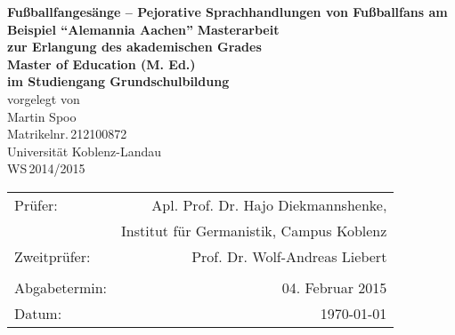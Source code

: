 \begin{titlepage}
	\begin{center}
		\quad
		\vfill
		\Huge{
			 \textbf{Fußballfangesänge – Pejorative Sprachhandlungen von Fußballfans am Beispiel "`Alemannia Aachen"'}
		}
		\vspace{5mm}
		\vfill
		\large{
			{\bfseries Masterarbeit\\
			\vspace{5mm}
			\normalfont \rmfamily zur Erlangung des akademischen Grades\\
			\bfseries Master of Education (M. Ed.)\\
			\vspace{5mm}
			\normalfont \rmfamily im Studiengang Grundschulbildung}
		}
		\\
		\vspace{1.5cm}
		\large{
			{vorgelegt von\\
			Martin Spoo\\
			Matrikelnr.\,212100872}
		}
		\vspace{1cm}
		\\
		\Large{
			{Universität Koblenz-Landau}\\
			{WS\,2014/2015}
		}
		\vspace{1cm}
		\begin{table}[b]
			\begin{center}
				\begin{tabular}{lr}
					Prüfer: & Apl. Prof. Dr. Hajo Diekmannshenke, \\
								&	Institut für Germanistik, Campus Koblenz \\
					Zweitprüfer: & Prof. Dr. Wolf-Andreas Liebert \\
					\vspace{0.25cm} \\
					Abgabetermin: & 04. Februar 2015 \\
					Datum: & \today
				\end{tabular}
			\end{center}
		\end{table}
	\end{center}
\end{titlepage}
\renewcommand{\baselinestretch}{1.1}
\restoregeometry

